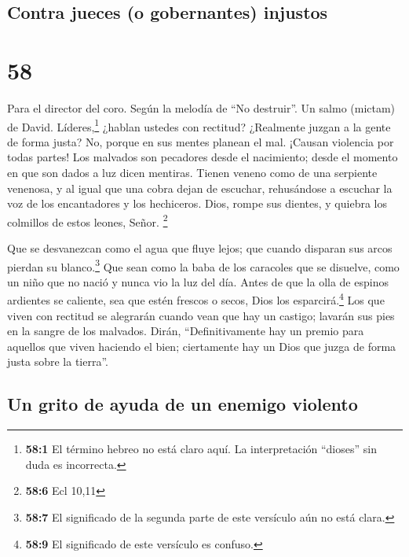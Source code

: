 \hypertarget{contra-jueces-o-gobernantes-injustos}{%
\subsection{Contra jueces (o gobernantes)
injustos}\label{contra-jueces-o-gobernantes-injustos}}

\hypertarget{section-57}{%
\section{58}\label{section-57}}

Para el director del coro. Según la melodía de ``No destruir''. Un salmo
(mictam) de David.  Líderes,\footnote{\textbf{58:1} El
  término hebreo no está claro aquí. La interpretación ``dioses'' sin
  duda es incorrecta.} ¿hablan ustedes con rectitud? ¿Realmente juzgan a
la gente de forma justa?  No, porque en sus mentes planean
el mal. ¡Causan violencia por todas partes!  Los malvados
son pecadores desde el nacimiento; desde el momento en que son dados a
luz dicen mentiras.  Tienen veneno como de una serpiente
venenosa, y al igual que una cobra dejan de escuchar, 
rehusándose a escuchar la voz de los encantadores y los hechiceros.
 Dios, rompe sus dientes, y quiebra los colmillos de estos
leones, Señor. \footnote{\textbf{58:6} Ecl 10,11}

 Que se desvanezcan como el agua que fluye lejos; que
cuando disparan sus arcos pierdan su blanco.\footnote{\textbf{58:7} El
  significado de la segunda parte de este versículo aún no está clara.}
 Que sean como la baba de los caracoles que se disuelve,
como un niño que no nació y nunca vio la luz del día. 
Antes de que la olla de espinos ardientes se caliente, sea que estén
frescos o secos, Dios los esparcirá.\footnote{\textbf{58:9} El
  significado de este versículo es confuso.}  Los que
viven con rectitud se alegrarán cuando vean que hay un castigo; lavarán
sus pies en la sangre de los malvados.  Dirán,
``Definitivamente hay un premio para aquellos que viven haciendo el
bien; ciertamente hay un Dios que juzga de forma justa sobre la
tierra''.

\hypertarget{un-grito-de-ayuda-de-un-enemigo-violento}{%
\subsection{Un grito de ayuda de un enemigo
violento}\label{un-grito-de-ayuda-de-un-enemigo-violento}}

